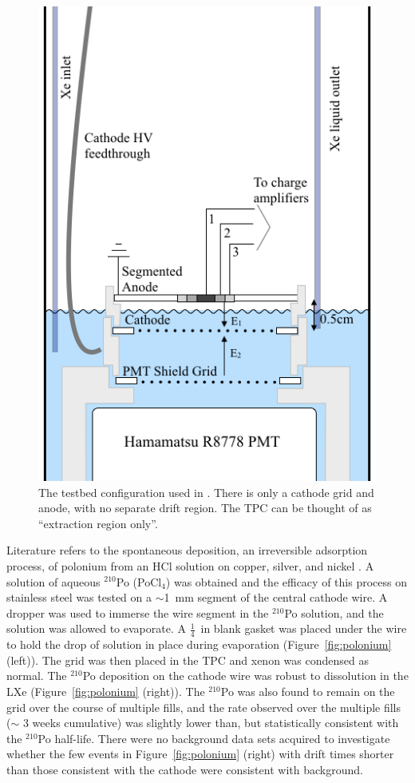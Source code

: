 \begin{figure}[htbp]
\begin{center}
\includegraphics[width=\halffig]{figures/etrains/internals_extraction.png}
\caption{The testbed configuration used in \cite{SorensenKamdin2018}. There is only a cathode grid and anode, with no separate drift region. The \acs{TPC} can be thought of as ``extraction region only''.}
\label{fig:extraction_tpc}
\end{center}
\end{figure}


Literature refers to the spontaneous deposition, an irreversible adsorption process, of polonium from an HCl solution on copper, silver, and nickel \cite{Hashimoto1990} \cite{Figgins1961}. A solution of aqueous $^{210}$Po (PoCl$_{4}$) was obtained and the efficacy of this process on stainless steel was tested on a $\sim$1~mm segment of the central cathode wire. A dropper was used to immerse the wire segment in the $^{210}$Po solution, and the solution was allowed to evaporate. A $\frac{1}{4}$~in blank gasket was placed under the wire to hold the drop of solution in place during evaporation (Figure~\ref{fig:polonium} (left)). The grid was then placed in the \ac{TPC} and xenon was condensed as normal. The $^{210}$Po deposition on the cathode wire was robust to dissolution in the \ac{LXe} (Figure~\ref{fig:polonium} (right)). The $^{210}$Po was also found to remain on the grid over the course of multiple fills, and the rate observed over the multiple fills ($\sim$ 3 weeks cumulative) was slightly lower than, but statistically consistent with the $^{210}$Po half-life. There were no background data sets acquired to investigate whether the few events in Figure~\ref{fig:polonium} (right) with drift times shorter than those consistent with the cathode were consistent with background. 

